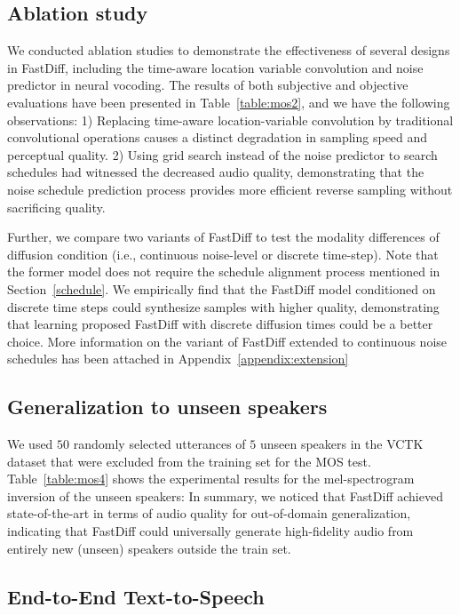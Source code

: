 \subsection{Ablation study}\label{ablation}
We conducted ablation studies to demonstrate the effectiveness of several designs in FastDiff, including the time-aware location variable convolution and noise predictor in neural vocoding. The results of both subjective and objective evaluations have been presented in Table~\ref{table:mos2}, and we have the following observations: 1) Replacing time-aware location-variable convolution by traditional convolutional operations causes a distinct degradation in sampling speed and perceptual quality. 2) Using grid search instead of the noise predictor to search schedules had witnessed the decreased audio quality, demonstrating that the noise schedule prediction process provides more efficient reverse sampling without sacrificing quality.

Further, we compare two variants of FastDiff to test the modality differences of diffusion condition (i.e., continuous noise-level or discrete time-step). Note that the former model does not require the schedule alignment process mentioned in Section~\ref{schedule}. We empirically find that the FastDiff model conditioned on discrete time steps could synthesize samples with higher quality, demonstrating that learning proposed FastDiff with discrete diffusion times could be a better choice. More information on the variant of FastDiff extended to continuous noise schedules has been attached in Appendix~\ref{appendix:extension}

\subsection{Generalization to unseen speakers}\label{Generalization}

We used $50$ randomly selected utterances of $5$ unseen speakers in the VCTK dataset that were excluded from the training set for the MOS test. Table~\ref{table:mos4} shows the experimental results for the mel-spectrogram inversion of the unseen speakers: In summary, we noticed that FastDiff achieved state-of-the-art in terms of audio quality for out-of-domain generalization, indicating that FastDiff could universally generate high-fidelity audio from entirely new (unseen) speakers outside the train set. 

\subsection{End-to-End Text-to-Speech}

